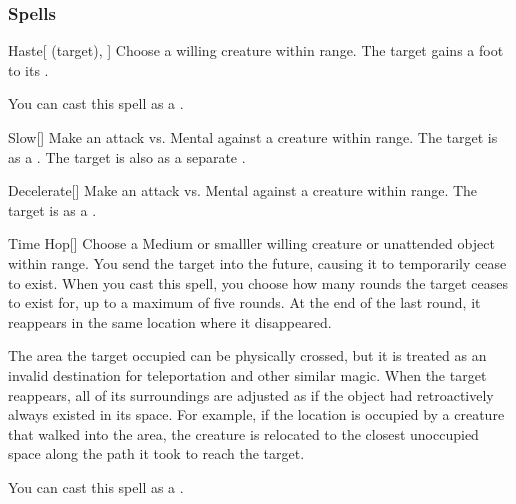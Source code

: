 \subsubsection{Spells}


\lowercase{\hypertarget{spell:Haste}{}}\label{spell:Haste}
\begin{attuneability}[\nth{1}]{\hypertarget{spell:Haste}{Haste}}[ (target), ]
Choose a willing creature within \rngmed range.
The target gains a  foot  to its .

You can cast this spell as a .
\end{attuneability}
\vspace{0.25em}



\lowercase{\hypertarget{spell:Slow}{}}\label{spell:Slow}
\begin{freeability}[\nth{1}]{\hypertarget{spell:Slow}{Slow}}[]
Make an attack vs. Mental against a creature within \rngmed range.
\hit The target is  as a .
\crit The target is also  as a separate .
\end{freeability}
\vspace{0.25em}



\lowercase{\hypertarget{spell:Decelerate}{}}\label{spell:Decelerate}
\begin{freeability}[\nth{2}]{\hypertarget{spell:Decelerate}{Decelerate}}[]
Make an attack vs. Mental against a creature within \rngmed range.
\hit The target is  as a .
\end{freeability}
\vspace{0.25em}



\lowercase{\hypertarget{spell:Time Hop}{}}\label{spell:Time Hop}
\begin{freeability}[\nth{2}]{\hypertarget{spell:Time Hop}{Time Hop}}[]
Choose a Medium or smalller willing creature or unattended object within \rngmed range.
You send the target into the future, causing it to temporarily cease to exist.
When you cast this spell, you choose how many rounds the target ceases to exist for, up to a maximum of five rounds.
At the end of the last round, it reappears in the same location where it disappeared.

The area the target occupied can be physically crossed, but it is treated as an invalid destination for teleportation and other similar magic.
When the target reappears, all of its surroundings are adjusted as if the object had retroactively always existed in its space.
For example, if the location is occupied by a creature that walked into the area, the creature is relocated to the closest unoccupied space along the path it took to reach the target.

You can cast this spell as a .
\end{freeability}
\vspace{0.25em}



